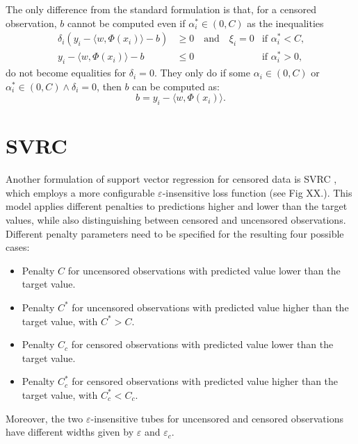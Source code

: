 \documentclass[12pt]{report}
\begin{document}
The only difference from the standard formulation is that, for a censored observation, $b$ cannot be computed even if $\alpha_{i}^{*} \in (0,C)$ as the inequalities
\begin{align}
\label{svcrcompb1}
\delta_{i}(y_{i} - \langle w,\Phi(x_{i})\rangle - b) &\geq 0 \quad \text{and} \quad \xi_{i}=0 &\text{if } \alpha_{i}^{*} < C \text{,}\\
\label{svcrcompb2}
y_{i} - \langle w,\Phi(x_{i})\rangle - b &\leq 0 &\text{if } \alpha_{i}^{*} > 0 \text{,}
\end{align}
do not become equalities for $\delta_{i} = 0$. They only do if some $\alpha_{i} \in (0,C)$ or $\alpha_{i}^{*} \in (0,C) \wedge \delta_{i} = 0$, then $b$ can be computed as:
\begin{equation} \label{svcrcompb3}
b = y_{i} - \langle w,\Phi(x_{i})\rangle \text{.}
\end{equation}

\section{SVRC}
Another formulation of support vector regression for censored data is SVRC \cite{khan08}, which employs a more configurable $\varepsilon$-insensitive loss function (see Fig XX.). This model applies different penalties to predictions higher and lower than the target values, while also distinguishing between censored and uncensored observations. Different penalty parameters need to be specified for the resulting four possible cases:
\begin{itemize}
\item Penalty $C$ for uncensored observations with predicted value lower than the target value.
\item Penalty $C^{*}$ for uncensored observations with predicted value higher than the target value, with $C^{*} > C$.
\item Penalty $C_{c}$ for censored observations with predicted value lower than the target value.
\item Penalty $C_{c}^{*}$ for censored observations with predicted value higher than the target value, with $C_{c}^{*} < C_{c}$.
\end{itemize}
Moreover, the two $\varepsilon$-insensitive tubes for uncensored and censored observations have different widths given by $\varepsilon$ and $\varepsilon_{c}$.
\end{document}
